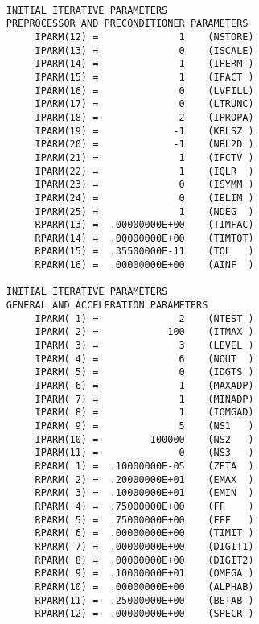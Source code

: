 \begin{verbatim}
 
     INITIAL ITERATIVE PARAMETERS
     PREPROCESSOR AND PRECONDITIONER PARAMETERS
          IPARM(12) =              1    (NSTORE)
          IPARM(13) =              0    (ISCALE)
          IPARM(14) =              1    (IPERM )
          IPARM(15) =              1    (IFACT )
          IPARM(16) =              0    (LVFILL)
          IPARM(17) =              0    (LTRUNC)
          IPARM(18) =              2    (IPROPA)
          IPARM(19) =             -1    (KBLSZ )
          IPARM(20) =             -1    (NBL2D )
          IPARM(21) =              1    (IFCTV )
          IPARM(22) =              1    (IQLR  )
          IPARM(23) =              0    (ISYMM )
          IPARM(24) =              0    (IELIM )
          IPARM(25) =              1    (NDEG  )
          RPARM(13) =  .00000000E+00    (TIMFAC)
          RPARM(14) =  .00000000E+00    (TIMTOT)
          RPARM(15) =  .35500000E-11    (TOL   )
          RPARM(16) =  .00000000E+00    (AINF  )
 
     INITIAL ITERATIVE PARAMETERS
     GENERAL AND ACCELERATION PARAMETERS
          IPARM( 1) =              2    (NTEST )
          IPARM( 2) =            100    (ITMAX )
          IPARM( 3) =              3    (LEVEL )
          IPARM( 4) =              6    (NOUT  )
          IPARM( 5) =              0    (IDGTS )
          IPARM( 6) =              1    (MAXADP)
          IPARM( 7) =              1    (MINADP)
          IPARM( 8) =              1    (IOMGAD)
          IPARM( 9) =              5    (NS1   )
          IPARM(10) =         100000    (NS2   )
          IPARM(11) =              0    (NS3   )
          RPARM( 1) =  .10000000E-05    (ZETA  )
          RPARM( 2) =  .20000000E+01    (EMAX  )
          RPARM( 3) =  .10000000E+01    (EMIN  )
          RPARM( 4) =  .75000000E+00    (FF    )
          RPARM( 5) =  .75000000E+00    (FFF   )
          RPARM( 6) =  .00000000E+00    (TIMIT )
          RPARM( 7) =  .00000000E+00    (DIGIT1)
          RPARM( 8) =  .00000000E+00    (DIGIT2)
          RPARM( 9) =  .10000000E+01    (OMEGA )
          RPARM(10) =  .00000000E+00    (ALPHAB)
          RPARM(11) =  .25000000E+00    (BETAB )
          RPARM(12) =  .00000000E+00    (SPECR )
\end{verbatim}
\newpage
